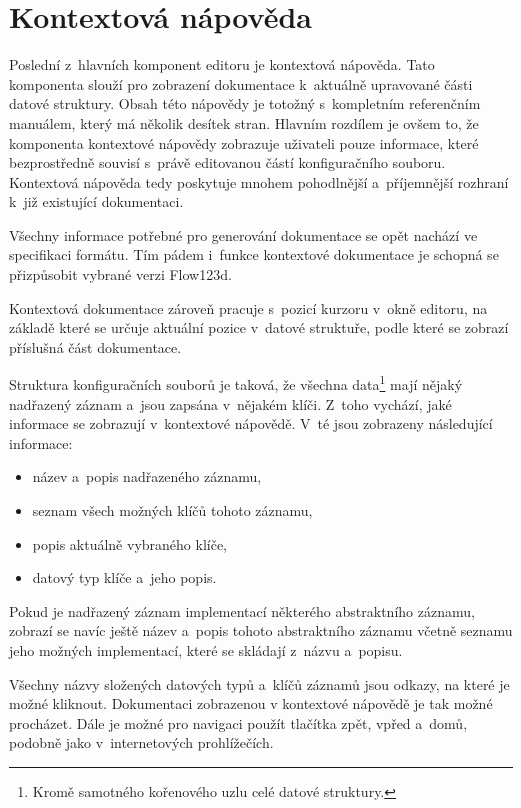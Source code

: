 \documentclass[FM,bw,DP]{tulthesis}
\begin{document}
\section{Kontextová nápověda}

Poslední z~hlavních komponent editoru je kontextová nápověda. Tato komponenta slouží pro zobrazení dokumentace k~aktuálně upravované části datové struktury. Obsah této nápovědy je totožný s~kompletním referenčním manuálem, který má několik desítek stran. Hlavním rozdílem je ovšem to, že komponenta kontextové nápovědy zobrazuje uživateli pouze informace, které bezprostředně souvisí s~právě editovanou částí konfiguračního souboru. Kontextová nápověda tedy poskytuje mnohem pohodlnější a~příjemnější rozhraní k~již existující dokumentaci.

Všechny informace potřebné pro generování dokumentace se opět nachází ve specifikaci formátu. Tím pádem i~funkce kontextové dokumentace je schopná se přizpůsobit vybrané verzi Flow123d.

Kontextová dokumentace zároveň pracuje s~pozicí kurzoru v~okně editoru, na základě které se určuje aktuální pozice v~datové struktuře, podle které se zobrazí příslušná část dokumentace.

Struktura konfiguračních souborů je taková, že všechna data\footnote{Kromě samotného kořenového uzlu celé datové struktury.} mají nějaký nad\-řa\-ze\-ný záznam a~jsou zapsána v~nějakém klíči. Z~toho vychází, jaké informace se zobrazují v~kontextové nápovědě. V~té jsou zobrazeny následující informace:

\begin{itemize}
\item název a~popis nadřazeného záznamu,
\item seznam všech možných klíčů tohoto záznamu,
\item popis aktuálně vybraného klíče,
\item datový typ klíče a~jeho popis.
\end{itemize}

Pokud je nadřazený záznam implementací některého abstraktního záznamu, zobrazí se navíc ještě název a~popis tohoto abstraktního záznamu včetně seznamu jeho možných implementací, které se skládají z~názvu a~popisu.

Všechny názvy složených datových typů a~klíčů záznamů jsou odkazy, na které je možné kliknout. Dokumentaci zobrazenou v kontextové nápovědě je tak možné procházet. Dále je možné pro navigaci použít tlačítka zpět, vpřed a~domů, podobně jako v~internetových prohlížečích.
\end{document}
